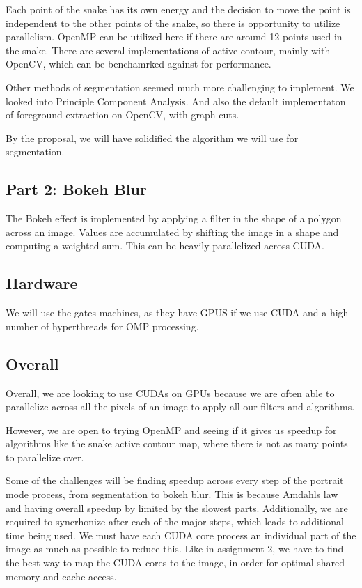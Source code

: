 \documentclass[12pt]{article}
\begin{document}
Each point of the snake has its own energy and the decision to move the point
is independent to the other points of the snake, so there is opportunity to
utilize parallelism. OpenMP can be utilized here if there are around 12 points
used in the snake. There are several implementations of active contour, mainly
with OpenCV, which can be benchamrked against for performance. \cite{cv-active}

Other methods of segmentation seemed much more challenging to implement. We
looked into Principle Component Analysis. \cite{pca-git} \cite{pca-paper} And
also the default implementaton of foreground extraction on OpenCV, with graph
cuts. \cite{cv-graphcut} \cite{grabcut-paper}

By the proposal, we will have solidified the algorithm we will use for
segmentation.

\subsection*{Part 2: Bokeh Blur}

The Bokeh effect is implemented by applying a filter in the shape of a polygon
across an image. Values are accumulated by shifting the image in a shape and
computing a weighted sum. This can be heavily parallelized across CUDA.
\cite{bokeh}

\subsection*{Hardware}

We will use the gates machines, as they have GPUS if we use CUDA and a high
number of hyperthreads for OMP processing.

\subsection*{Overall}

Overall, we are looking to use CUDAs on GPUs because we are often able to
parallelize across all the pixels of an image to apply all our filters and
algorithms.

However, we are open to trying OpenMP and seeing if it gives us speedup for
algorithms like the snake active contour map, where there is not as many points
to parallelize over.

Some of the challenges will be finding speedup across every step of the
portrait mode process, from segmentation to bokeh blur. This is because Amdahls
law and having overall speedup by limited by the slowest parts. Additionally,
we are required to syncrhonize after each of the major steps, which leads to
additional time being used. We must have each CUDA core process an individual
part of the image as much as possible to reduce this. Like in assignment 2, we
have to find the best way to map the CUDA cores to the image, in order for
optimal shared memory and cache access.
\end{document}
